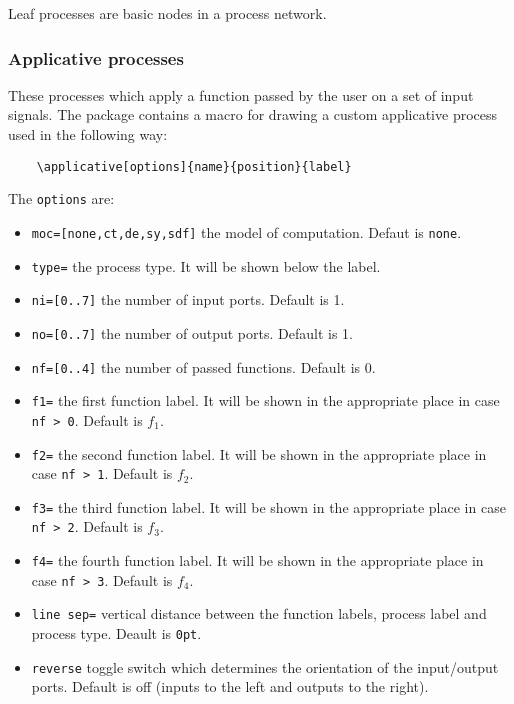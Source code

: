 \documentclass[10pt]{article}
\begin{document}
Leaf processes are basic nodes in a process network.

\subsubsection{Applicative processes} \label{tikz_applicative}

These processes which apply a function passed by the user on a set of input signals. The package contains a macro for drawing a custom applicative process used in the following way:

\begin{verbatim}
	\applicative[options]{name}{position}{label}
\end{verbatim}

The \texttt{options} are:
\begin{itemize}
\item \texttt{moc=[none,ct,de,sy,sdf]} the model of computation. Defaut is \texttt{none}.
\item \texttt{type=} the process type. It will be shown below the label.
\item \texttt{ni=[0..7]} the number of input ports. Default is 1.
\item \texttt{no=[0..7]} the number of output ports. Default is 1.
\item \texttt{nf=[0..4]} the number of passed functions. Default is 0.
\item \texttt{f1=} the first function label. It will be shown in the appropriate place in case \texttt{nf > 0}. Default is $f_1$.
\item \texttt{f2=} the second function label. It will be shown in the appropriate place in case \texttt{nf > 1}. Default is $f_2$.
\item \texttt{f3=} the third function label. It will be shown in the appropriate place in case \texttt{nf > 2}. Default is $f_3$.
\item \texttt{f4=} the fourth function label. It will be shown in the appropriate place in case \texttt{nf > 3}. Default is $f_4$.
\item\texttt{line sep=} vertical distance between the function labels, process label and process type. Deault is \texttt{0pt}.
\item\texttt{reverse} toggle switch which determines the orientation of the input/output ports. Default is off (inputs to the left and outputs to the right).

\end{itemize}
\end{document}
